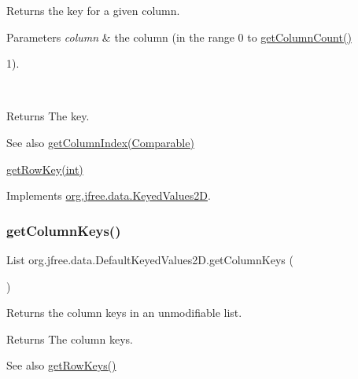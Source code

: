 Returns the key for a given column.


\begin{DoxyParams}{Parameters}
{\em column} & the column (in the range 0 to \mbox{\hyperlink{classorg_1_1jfree_1_1data_1_1_default_keyed_values2_d_add387af47bf3263842b9c06ef212bad2}{get\+Column\+Count()}}
\begin{DoxyItemize}
\item 1).
\end{DoxyItemize}\\
\hline
\end{DoxyParams}
\begin{DoxyReturn}{Returns}
The key.
\end{DoxyReturn}
\begin{DoxySeeAlso}{See also}
\mbox{\hyperlink{classorg_1_1jfree_1_1data_1_1_default_keyed_values2_d_a7850b37a7f84b089906f1713b6fef6f0}{get\+Column\+Index(\+Comparable)}} 

\mbox{\hyperlink{classorg_1_1jfree_1_1data_1_1_default_keyed_values2_d_ada2ab1693bba62c0f8a8d5e046614b59}{get\+Row\+Key(int)}} 
\end{DoxySeeAlso}


Implements \mbox{\hyperlink{interfaceorg_1_1jfree_1_1data_1_1_keyed_values2_d_a9ced6cbaf04f048db059e1ebf5184d2a}{org.\+jfree.\+data.\+Keyed\+Values2D}}.

\mbox{\label{classorg_1_1jfree_1_1data_1_1_default_keyed_values2_d_ae390bd83ecd242c0e90eee1d8adede7a}} 
\subsubsection{\texorpdfstring{get\+Column\+Keys()}{getColumnKeys()}}
{\footnotesize\ttfamily List org.\+jfree.\+data.\+Default\+Keyed\+Values2\+D.\+get\+Column\+Keys (\begin{DoxyParamCaption}{ }\end{DoxyParamCaption})}

Returns the column keys in an unmodifiable list.

\begin{DoxyReturn}{Returns}
The column keys.
\end{DoxyReturn}
\begin{DoxySeeAlso}{See also}
\mbox{\hyperlink{classorg_1_1jfree_1_1data_1_1_default_keyed_values2_d_a5def878586be4fbe2c3bc7750eaac41b}{get\+Row\+Keys()}} 
\end{DoxySeeAlso}


